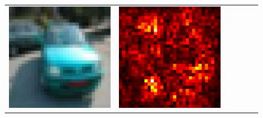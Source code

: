 \documentclass[preprint,12pt]{elsarticle}
\begin{document}
\begin{figure}[p]
\begin{tabular}{cccccc}
  \includegraphics[scale=\scale]{../visualizations/examples/cifar10/resnet18/images/1.png} &
  \includegraphics[scale=\scale]{../visualizations/examples/cifar10/resnet18/saliency_map/1.png} & 

\end{tabular}
\end{figure}
\end{document}
